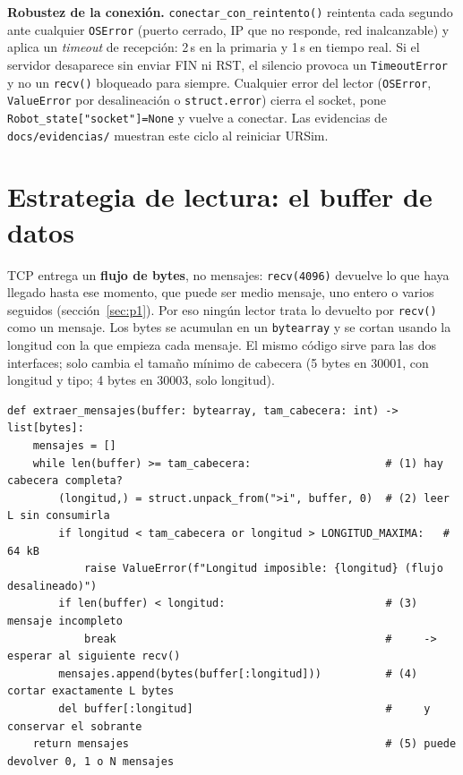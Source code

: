 \documentclass[10pt,a4paper]{article}
\newcommand{\code}[1]{\texttt{\small #1}}
\begin{document}
\vspace{-4pt}
\textbf{Robustez de la conexión.} \code{conectar\_con\_reintento()} reintenta cada segundo ante cualquier \code{OSError} (puerto cerrado, IP que no responde, red inalcanzable) y aplica un \emph{timeout} de recepción: 2\,s en la primaria y 1\,s en tiempo real. Si el servidor desaparece sin enviar FIN ni RST, el silencio provoca un \code{TimeoutError} y no un \code{recv()} bloqueado para siempre. Cualquier error del lector (\code{OSError}, \code{ValueError} por desalineación o \code{struct.error}) cierra el socket, pone \code{Robot\_state["socket"]=None} y vuelve a conectar. Las evidencias de \code{docs/evidencias/} muestran este ciclo al reiniciar URSim.

\section{Estrategia de lectura: el buffer de datos}

TCP entrega un \textbf{flujo de bytes}, no mensajes: \code{recv(4096)} devuelve lo que haya llegado hasta ese momento, que puede ser medio mensaje, uno entero o varios seguidos (sección~\ref{sec:p1}). Por eso ningún lector trata lo devuelto por \code{recv()} como un mensaje. Los bytes se acumulan en un \code{bytearray} y se cortan usando la longitud con la que empieza cada mensaje. El mismo código sirve para las dos interfaces; solo cambia el tamaño mínimo de cabecera (5 bytes en 30001, con longitud y tipo; 4 bytes en 30003, solo longitud).

\noindent\begin{minipage}{\linewidth}
\begin{lstlisting}[firstnumber=31]
def extraer_mensajes(buffer: bytearray, tam_cabecera: int) -> list[bytes]:
    mensajes = []
    while len(buffer) >= tam_cabecera:                     # (1) hay cabecera completa?
        (longitud,) = struct.unpack_from(">i", buffer, 0)  # (2) leer L sin consumirla
        if longitud < tam_cabecera or longitud > LONGITUD_MAXIMA:   # 64 kB
            raise ValueError(f"Longitud imposible: {longitud} (flujo desalineado)")
        if len(buffer) < longitud:                         # (3) mensaje incompleto
            break                                          #     -> esperar al siguiente recv()
        mensajes.append(bytes(buffer[:longitud]))          # (4) cortar exactamente L bytes
        del buffer[:longitud]                              #     y conservar el sobrante
    return mensajes                                        # (5) puede devolver 0, 1 o N mensajes
\end{lstlisting}
\end{minipage}
\end{document}
